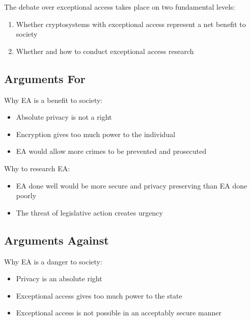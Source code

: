 


The debate over exceptional access takes place on two fundamental levels:
\begin{enumerate}
    \item Whether cryptosystems with exceptional access represent a net benefit to society
    \item Whether and how to conduct exceptional access research
\end{enumerate}

\subsection{Arguments For}

Why EA is a benefit to society:
\begin{itemize}
    \item Absolute privacy is not a right
    \item Encryption gives too much power to the individual
    \item EA would allow more crimes to be prevented and prosecuted
\end{itemize}

Why to research EA:
\begin{itemize}
    \item EA done well would be more secure and privacy preserving than EA done poorly
    \item The threat of legislative action creates urgency
\end{itemize}

\subsection{Arguments Against}

Why EA is a danger to society:
\begin{itemize}
    \item Privacy is an absolute right
    \item Exceptional access gives too much power to the state
    \item Exceptional access is not possible in an acceptably secure manner
\end{itemize}

